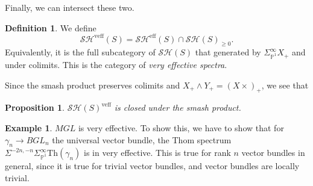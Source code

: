 \documentclass{shortart}
\newtheorem{prop}[thm]{Proposition}
\theoremstyle{definition}
\newtheorem{defi}[thm]{Definition}
\newtheorem{eg}[thm]{Example}
\newcommand\Th{\mathrm{Th}}
\newcommand\SH{\mathcal{SH}}
\renewcommand\P{\mathbb{P}}
\newcommand\eff{\mathrm{eff}}
\newcommand\veff{\mathrm{veff}}
\begin{document}
Finally, we can intersect these two.
\begin{defi}
  We define
  \[
    \SH^{\veff}(S) = \SH^{\eff}(S) \cap \SH(S)_{\geq 0}.
  \]
  Equivalently, it is the full subcategory of $\SH(S)$ that generated by $\Sigma^\infty_{\P^1} X_+$ and under colimits. This is the category of \emph{very effective spectra}.
\end{defi}

Since the smash product preserves colimits and $X_+ \wedge Y_+ = (X \times )_+$, we see that
\begin{prop}
  $\SH(S)^{\veff}$ is closed under the smash product.
\end{prop}

\begin{eg}
  $MGL$ is very effective. To show this, we have to show that for $\gamma_n \to BGL_n$ the universal vector bundle, the Thom spectrum $\Sigma^{-2n, -n} \Sigma^\infty_{\P^1}\Th(\gamma_n)$ is in very effective. This is true for rank $n$ vector bundles in general, since it is true for trivial vector bundles, and vector bundles are locally trivial.
\end{eg}
\end{document}
